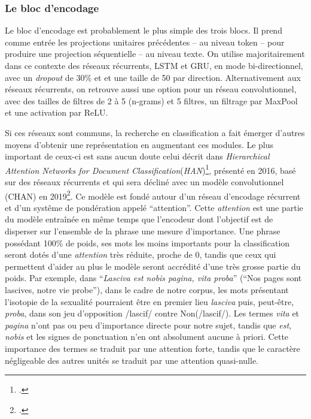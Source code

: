 \subsubsection{Le bloc d'encodage}
\label{part:chap4:architectures:variations-architectures:encodage}

Le bloc d'encodage est probablement le plus simple des trois blocs. Il prend comme entrée les projections unitaires précédentes -- au niveau token -- pour produire une projection séquentielle -- au niveau texte. On utilise majoritairement dans ce contexte des réseaux récurrents, LSTM et GRU, en mode bi-directionnel, avec un \textit{dropout} de 30\% et et une taille de 50 par direction. Alternativement aux réseaux récurrents, on retrouve aussi une option pour un réseau convolutionnel, avec des tailles de filtres de 2 à 5 (n-grams) et 5 filtres, un filtrage par MaxPool et une activation par ReLU.

Si ces réseaux sont communs, la recherche en classification a fait émerger d'autres moyens d'obtenir une représentation en augmentant ces modules. Le plus important de ceux-ci est sans aucun doute celui décrit dans \textit{Hierarchical Attention Networks for Document Classification}(\textit{HAN})\footcite{yang_hierarchical_2016}, présenté en 2016, basé sur des réseaux récurrents et qui sera décliné avec un modèle convolutionnel (CHAN) en 2019\footcite{gao_hierarchical_2018}. Ce modèle est fondé autour d'un réseau d'encodage récurrent et d'un systême de pondération appelé \enquote{attention}. Cette \textit{attention} est une partie du modèle entraînée en même temps que l'encodeur dont l'objectif est de disperser sur l'ensemble de la phrase une mesure d'importance. Une phrase possédant 100\% de poids, ses mots les moins importants pour la classification seront dotés d'une \textit{attention} très réduite, proche de 0, tandis que ceux qui permettent d'aider au plus le modèle seront accrédité d'une très grosse partie du poids. Par exemple, dans \enquote{\textit{Lasciva est nobis pagina, vita proba}} (\enquote{Nos pages sont lascives, notre vie probe}), dans le cadre de notre corpus, les mots présentant l'isotopie de la sexualité pourraient être en premier lieu \textit{lasciva} puis, peut-être, \textit{proba}, dans son jeu d'opposition /lascif/ contre Non(/lascif/). Les termes \textit{vita} et \textit{pagina} n'ont pas ou peu d'importance directe pour notre sujet, tandis que \textit{est}, \textit{nobis} et les signes de ponctuation n'en ont absolument aucune à priori. Cette importance des termes se traduit par une attention forte, tandis que le caractère négligeable des autres unités se traduit par une attention quasi-nulle.

